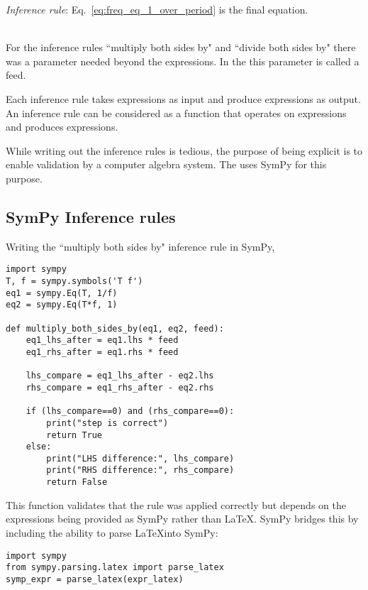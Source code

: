 \textit{Inference rule}: Eq.~\ref{eq:freq_eq_1_over_period} is the final equation.

\ \\

For the inference rules ``multiply both sides by" and ``divide both sides by"  there was a parameter needed beyond the expressions. In the \pdg{} this parameter is called a \gls{feed}.

Each inference rule takes expressions as input and produce expressions as output. An inference rule can be considered as a function that operates on expressions and produces expressions.

While writing out the inference rules is tedious, the purpose of being explicit is to enable validation by a computer algebra system. The \pdg{} uses SymPy for this purpose. 

\subsection{SymPy Inference rules}

Writing the ``multiply both sides by" inference rule in SymPy,
\begin{verbatim}
import sympy
T, f = sympy.symbols('T f')
eq1 = sympy.Eq(T, 1/f)
eq2 = sympy.Eq(T*f, 1)

def multiply_both_sides_by(eq1, eq2, feed):
    eq1_lhs_after = eq1.lhs * feed
    eq1_rhs_after = eq1.rhs * feed

    lhs_compare = eq1_lhs_after - eq2.lhs 
    rhs_compare = eq1_rhs_after - eq2.rhs 

    if (lhs_compare==0) and (rhs_compare==0):
        print("step is correct")
        return True
    else:
        print("LHS difference:", lhs_compare)
        print("RHS difference:", rhs_compare)
        return False
\end{verbatim}

This function validates that the rule was applied correctly but depends on the expressions being provided as SymPy rather than \LaTeX. SymPy bridges this by including the ability to parse \LaTeX into SymPy:

\begin{verbatim}
import sympy
from sympy.parsing.latex import parse_latex 
symp_expr = parse_latex(expr_latex)
\end{verbatim}
